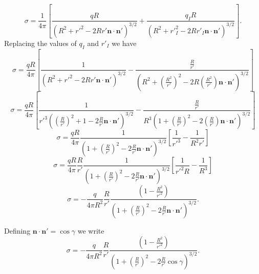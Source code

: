 \begin{equation}
 \sigma =  \frac{1}{4 \pi } \left[  \frac{q R }{\left(R^2 + r'^2 - 2 Rr' \textbf{n} \cdot \textbf{n}' \right)^{3/2} } + \frac{q_I R }{\left(R^2 + r'^2_I - 2 Rr'_I \textbf{n} \cdot \textbf{n}' \right)^{3/2}} \right].  
 \end{equation} 
Replacing the values of $q_I$ and $r'_I$ we have
\begin{equation}
 \sigma =  \frac{qR}{4 \pi } \left[  \frac{ 1 }{\left(R^2 + r'^2 - 2 Rr' \textbf{n} \cdot \textbf{n}' \right)^{3/2} } - \frac{\frac{R}{r'}  }{\left(R^2 + \left( \frac{R^2}{r'} \right)^2 - 2 R \left( \frac{R^2}{r'} \right)  \textbf{n} \cdot \textbf{n}' \right)^{3/2}} \right]  
 \end{equation} 
\begin{equation}
 \sigma =  \frac{qR}{4 \pi } \left[  \frac{ 1 }{r'^3 \left(\left(\frac{R}{r'}\right)^2 + 1 - 2 \frac{R}{r'} \textbf{n} \cdot \textbf{n}' \right)^{3/2} } - \frac{\frac{R}{r'}  }{R^3 \left(1 + \left( \frac{R}{r'} \right)^2 - 2  \left( \frac{R}{r'} \right)  \textbf{n} \cdot \textbf{n}' \right)^{3/2}} \right]
 \end{equation} 
\begin{equation}
 \sigma =  \frac{qR}{4 \pi } \frac{ 1 }{ \left( 1+ \left(\frac{R}{r'}\right)^2 - 2 \frac{R}{r'} \textbf{n} \cdot \textbf{n}' \right)^{3/2} } \left[  \frac{ 1 }{r'^3 } - \frac{1 }{R^2 r'} \right]  
 \end{equation} 
 \begin{equation}
 \sigma =  \frac{qR}{4 \pi } \frac{R}{r'} \frac{ 1 }{ \left( 1+ \left(\frac{R}{r'}\right)^2 - 2 \frac{R}{r'} \textbf{n} \cdot \textbf{n}' \right)^{3/2} } \left[  \frac{ 1 }{r'^2 R } - \frac{1 }{R^3} \right] 
 \end{equation} 
  \begin{equation}
 \sigma = - \frac{q}{4 \pi R^2 } \frac{R}{r'} \frac{ \left(  1- \frac{ R^2}{r'^2  }  \right) }{ \left( 1+ \left(\frac{R}{r'}\right)^2 - 2 \frac{R}{r'} \textbf{n} \cdot \textbf{n}' \right)^{3/2} } .  
 \end{equation} 
 
Defining $\textbf{n} \cdot \textbf{n}' = \cos \gamma$ we write
  \begin{equation}
 \sigma = - \frac{q}{4 \pi R^2 } \frac{R}{r'} \frac{ \left(  1- \frac{ R^2}{r'^2  }  \right) }{ \left( 1+ \left(\frac{R}{r'}\right)^2 - 2 \frac{R}{r'} \cos \gamma \right)^{3/2} } .  \label{ConductingSphereChargeDensity}
 \end{equation} 

